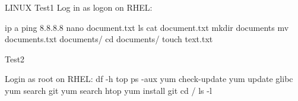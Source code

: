 LINUX
Test1
Log in as logon on RHEL:

ip a
ping 8.8.8.8
nano document.txt
ls
cat document.txt
mkdir documents
mv documents.txt documents/
cd documents/
touch text.txt



Test2

Login as root on RHEL:
df -h
top
ps -aux
yum check-update
yum update glibc
yum search git
yum search htop
yum install git
cd /
ls -l

